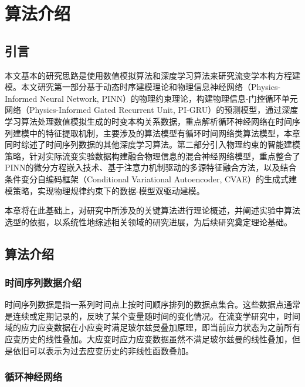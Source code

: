 \chapter{算法介绍}
\section{引言}
本文基本的研究思路是使用数值模拟算法和深度学习算法来研究流变学本构方程建模。本文研究第一部分基于动态时序建模理论和物理信息神经网络（Physics-Informed Neural Network, PINN）的物理约束理论，构建物理信息-门控循环单元网络（Physics-Informed Gated Recurrent Unit, PI-GRU）的预测模型，通过深度学习算法处理数值模拟生成的时变本构关系数据，重点解析循环神经网络在时间序列建模中的特征提取机制，主要涉及的算法模型有循环时间网络类算法模型，本章同时综述了时间序列数据的其他深度学习算法。第二部分引入物理约束的智能建模策略，针对实际流变实验数据构建融合物理信息的混合神经网络模型，重点整合了PINN的微分方程嵌入技术、基于注意力机制驱动的多源特征融合方法，以及结合条件变分自编码框架（Conditional Variational Autoencoder, CVAE）的生成式建模策略，实现物理规律约束下的数据-模型双驱动建模。

本章将在此基础上，对研究中所涉及的关键算法进行理论概述，并阐述实验中算法选型的依据，以系统性地综述相关领域的研究进展，为后续研究奠定理论基础。
\section{算法介绍}
\subsection{时间序列数据介绍}
时间序列数据是指一系列时间点上按时间顺序排列的数据点集合。这些数据点通常是连续或定期记录的，反映了某个变量随时间的变化情况。在流变学研究中，时间域的应力应变数据在小应变时满足玻尔兹曼叠加原理，即当前应力状态为之前所有应变历史的线性叠加\cite{boltzmannZurTheorieElastischen1878}。大应变时应力应变数据虽然不满足玻尔兹曼的线性叠加，但是依旧可以表示为过去应变历史的非线性函数叠加。

\subsection{循环神经网络}
